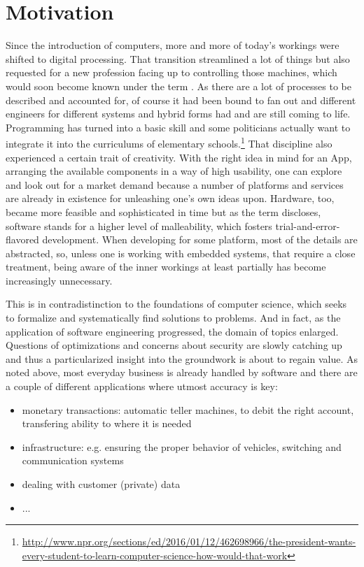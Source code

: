 \section{Motivation}
Since the introduction of computers, more and more of today's workings were shifted to digital processing. That transition streamlined a lot of things but also requested for a new profession facing up to controlling those machines, which would soon become known under the term . As there are a lot of processes to be described and accounted for, of course it had been bound to fan out and different engineers for different systems and hybrid forms had and are still coming to life. Programming has turned into a basic skill and some politicians actually want to integrate it into the curriculums of elementary schools.\footnote{\url{http://www.npr.org/sections/ed/2016/01/12/462698966/the-president-wants-every-student-to-learn-computer-science-how-would-that-work}} That discipline also experienced a certain trait of creativity. With the right idea in mind for an App, arranging the available components in a way of high usability, one can explore and look out for a market demand because a number of platforms and services are already in existence for unleashing one's own ideas upon. Hardware, too, became more feasible and sophisticated in time but as the term discloses, software stands for a higher level of malleability, which fosters trial-and-error-flavored development. When developing for some platform, most of the details are abstracted, so, unless one is working with embedded systems, that require a close treatment, being aware of the inner workings at least partially has become increasingly unnecessary.


This is in contradistinction to the foundations of computer science, which seeks to formalize and systematically find solutions to problems. And in fact, as the application of software engineering progressed, the domain of topics enlarged. Questions of optimizations and concerns about security are slowly catching up and thus a particularized insight into the groundwork is about to regain value. As noted above, most everyday business is already handled by software and there are a couple of different applications where utmost accuracy is key:

\begin{itemize}
	\item monetary transactions: automatic teller machines, to debit the right account, transfering ability to where it is needed
	\item infrastructure: e.g. ensuring the proper behavior of vehicles, switching and communication systems
	\item dealing with customer (private) data
	\item ...
\end{itemize}

